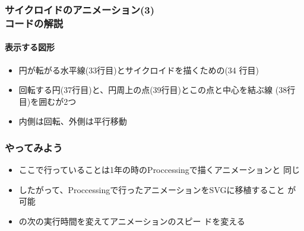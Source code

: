 \begin{frame}[containsverbatim]
 \frametitle{サイクロイドのアニメーション(3)\\コードの解説}
 \framesubtitle{表示する図形}
 \begin{itemize}
  \item 円が転がる水平線(33行目)とサイクロイドを描くための(34
        行目)
  \item 回転する円(37行目)と、円周上の点(39行目)とこの点と中心を結ぶ線
        (38行目)を囲むが2つ
  \item 内側は回転、外側は平行移動
 \end{itemize}
\end{frame}
\begin{frame}[containsverbatim]
 \frametitle{やってみよう}
\begin{itemize}
 \item ここで行っていることは1年の時のProccessingで描くアニメーションと
       同じ
 \item したがって、Proccessingで行ったアニメーションをSVGに移植すること
       が可能
 \item {}の次の実行時間を変えてアニメーションのスピー
       ドを変える
\end{itemize}
\end{frame}

\begin{frame}[containsverbatim]
 \frametitle{}
\end{frame}
